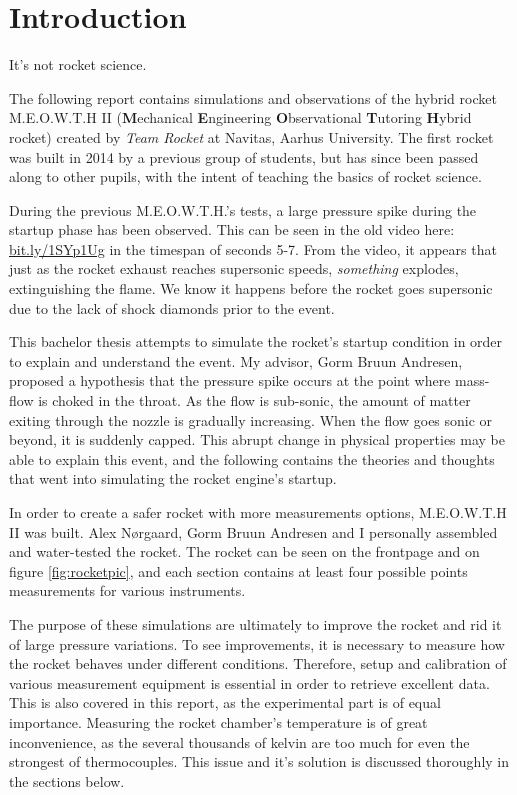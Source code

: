 \chapter{Introduction}

It's not rocket science.

The following report contains simulations and observations of the hybrid rocket M.E.O.W.T.H II (\textbf{M}echanical \textbf{E}ngineering \textbf{O}bservational \textbf{T}utoring \textbf{H}ybrid rocket) created by \emph{Team Rocket} \cite{bulba} at Navitas, Aarhus University. The first rocket was built in 2014 by a previous group of students, but has since been passed along to other pupils, with the intent of teaching the basics of rocket science.


During the previous M.E.O.W.T.H.'s tests, a large pressure spike during the startup phase has been observed. This can be seen in the old video here: \url{bit.ly/1SYp1Ug} in the timespan of seconds 5-7. From the video, it appears that just as the rocket exhaust reaches supersonic speeds, \emph{something} explodes, extinguishing the flame. We know it happens before the rocket goes supersonic due to the lack of shock diamonds prior to the event.\cite[chapter 18, p.~643]{rockProp}


This bachelor thesis attempts to simulate the rocket's startup condition in order to explain and understand the event. My advisor, Gorm Bruun Andresen, proposed a hypothesis that the pressure spike occurs at the point where mass-flow is choked in the throat. As the flow is sub-sonic, the amount of matter exiting through the nozzle is gradually increasing. When the flow goes sonic or beyond, it is suddenly capped. This abrupt change in physical properties may be able to explain this event, and the following contains the theories and thoughts that went into simulating the rocket engine's startup.


In order to create a safer rocket with more measurements options, M.E.O.W.T.H II was built. Alex Nørgaard, Gorm Bruun Andresen and I personally assembled and water-tested the rocket. The rocket can be seen on the frontpage and on figure \ref{fig:rocketpic}, and each section contains at least four possible points measurements for various instruments.


The purpose of these simulations are ultimately to improve the rocket and rid it of large pressure variations. To see improvements, it is necessary to measure how the rocket behaves under different conditions. Therefore, setup and calibration of various measurement equipment is essential in order to retrieve excellent data. This is also covered in this report, as the experimental part is of equal importance. Measuring the rocket chamber's temperature is of great inconvenience, as the several thousands of kelvin are too much for even the strongest of thermocouples.\cite{thermocoup} This issue and it's solution is discussed thoroughly in the sections below.



